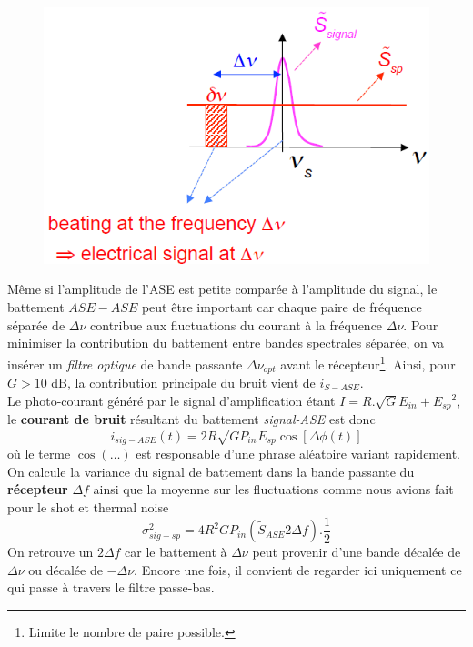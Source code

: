 	\begin{figure}
	\vspace{-8mm}
	\includegraphics[scale=0.4]{ch6/image11}
	\end{figure}
Même si l'amplitude de l'ASE est petite comparée à l'amplitude du signal, le battement $ASE-ASE$ peut être 
important car chaque paire de fréquence séparée de $\Delta\nu$ contribue aux fluctuations du courant à la
fréquence $\Delta\nu$. Pour minimiser la contribution du battement entre bandes spectrales séparée, on va
insérer un \textit{filtre optique} de bande passante $\Delta \nu_{opt}$ avant le récepteur\footnote{Limite le
nombre de paire possible.}. Ainsi, pour $G>10$ dB, la contribution principale du bruit vient de $i_{S-ASE}$.\\

Le photo-courant généré par le signal d'amplification étant $I = R.\sqrt G {E_{in}} + {E_{sp}}{^2}$, le \textbf{courant de bruit} résultant du battement \textit{signal-ASE} est donc
\begin{equation}
{i_{sig - ASE}}(t) = 2R\sqrt {G{P_{in}}} {E_{sp}}\cos [\Delta \phi (t)]
\end{equation}
où le terme $\cos(\dots)$ est responsable d'une phrase aléatoire variant rapidement.\\

On calcule la variance du signal de battement dans la bande passante du \textbf{récepteur} $\Delta f$ ainsi
que la moyenne sur les fluctuations comme nous avions fait pour le shot et thermal noise
\begin{equation}
\sigma _{sig - sp}^2 = 4{R^2}G{P_{in}}({\tilde S_{ASE}}2\Delta f).\frac{1}{2}
\end{equation}
On retrouve un $2\Delta f$ car le battement à $\Delta \nu$ peut provenir d'une bande décalée de $\Delta \nu$
ou décalée de $-\Delta \nu$. Encore une fois, il convient de regarder ici uniquement ce qui passe à travers
le filtre passe-bas. \\

